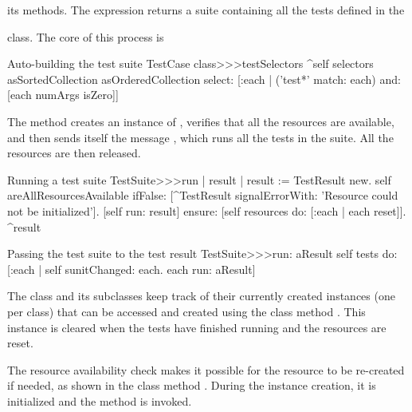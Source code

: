 \documentclass[a4paper,10pt,twoside]{book}
\begin{document}
its methods.  The expression  returns a suite containing all the tests defined in the { class.
The core of this process is
\begin{method}[testcasetestselectors]{Auto-building the test suite}
TestCase class>>>testSelectors 
	^self selectors asSortedCollection asOrderedCollection select: [:each | 
		('test*' match: each) and: [each numArgs isZero]]
\end{method}

The method  creates an instance of
, verifies that all the resources are available, and then sends itself
the message , which runs all
the tests in the suite.  All the resources are then
released.
\begin{method}[testsuiterun]{Running a test suite}
TestSuite>>>run
	| result |
	result := TestResult new.
	self areAllResourcesAvailable
		ifFalse: [^TestResult signalErrorWith:
				   'Resource could not be initialized'].
	[self run: result] ensure: [self resources do:
									 [:each | each reset]].
	^result
\end{method}

\begin{method}[testsuiterun:]{Passing the test suite to the test result}
TestSuite>>>run: aResult
	self tests do:
			[:each |
			self sunitChanged: each.
			each run: aResult]
\end{method}
The class  and its subclasses keep track of
their currently created instances (one per class) that can be accessed
and created using the class method .  This instance is
cleared when the tests have finished running and the resources are
reset.

The resource availability check makes it possible for the resource to be 
re-created if needed, as shown in the class method .  During the 
instance creation, it is initialized and the method  is
invoked.


}
\end{document}
